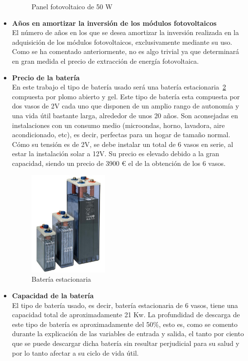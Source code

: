 \begin{itemize}
\begin{figure}[!h]
            \caption{Panel fotovoltaico de 50 W}
            \label{fig:pv_module}
          \end{figure}
	\item \textbf{Años en amortizar la inversión de los módulos fotovoltaicos}\\ El número de años en los que se desea amortizar la inversión realizada en la adquisición de los módulos fotovoltaicos, exclusivamente mediante su uso. Como se ha comentado anteriormente, no es algo trivial ya que determinará en gran medida el precio de extracción de energía fotovoltaica.
	\item \textbf{Precio de la batería}\\ En este trabajo el tipo de batería usado será una batería estacionaria~\ref{fig:bateria} compuesta por plomo abierto y gel. Este tipo de batería esta compuesta por dos vasos de 2V cada uno que disponen de un amplio rango de autonomía y una vida útil bastante larga, alrededor de unos 20 años. Son aconsejadas en instalaciones con un consumo medio (microondas, horno, lavadora, aire acondicionado, etc), es decir, perfectas para un hogar de tamaño normal. Cómo su tensión es de 2V, se debe instalar un total de 6 vasos en serie, al estar la instalación solar a 12V. Su precio es elevado debido a la gran capacidad, siendo un precio de 3900 € el de la obtención de los 6 vasos.
           \begin{figure}[!h]
            \centering
            \includegraphics[width=4cm]{figs/bateria.jpg}
            \caption{Batería estacionaria}
            \label{fig:bateria}
          \end{figure}
	\item \textbf{Capacidad de la batería}\\ El tipo de batería usado, es decir, batería estacionaria de 6 vasos, tiene una capacidad total de aproximadamente 21 Kw. La profundidad de descarga de este tipo de batería es aproximadamente del 50\%, esto es, como se comento durante la explicación de las variables de entrada y salida, el tanto por ciento que se puede descargar dicha batería sin resultar perjudicial para su salud y por lo tanto afectar a su ciclo de vida útil.

\end{itemize}
